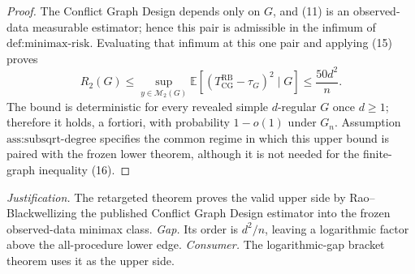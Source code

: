 \documentclass{article}
\begin{document}
\begin{proof}
The Conflict Graph Design depends only on \(G\), and (11) is an observed-data measurable estimator; hence this pair is admissible in the infimum of \(\text{def:minimax-risk}\).  Evaluating that infimum at this one pair and applying (15) proves
\[
R_2(G)\le
\sup_{y\in\mathcal M_2(G)}
\mathbb E[(T_{\mathrm{CG}}^{\mathrm{RB}}-\tau_G)^2\mid G]
\le\frac{50d^2}{n}. \tag{16}
\]
The bound is deterministic for every revealed simple \(d\)-regular \(G\) once \(d\ge1\); therefore it holds, a fortiori, with probability \(1-o(1)\) under \(G_n\).  Assumption \(\text{ass:subsqrt-degree}\) specifies the common regime in which this upper bound is paired with the frozen lower theorem, although it is not needed for the finite-graph inequality (16).
\end{proof}
\par\smallskip\noindent \textit{Justification.} The retargeted theorem proves the valid upper side by Rao--Blackwellizing the published Conflict Graph Design estimator into the frozen observed-data minimax class. \textit{Gap.} Its order is \(d^2/n\), leaving a logarithmic factor above the all-procedure lower edge. \textit{Consumer.} The logarithmic-gap bracket theorem uses it as the upper side.
\end{document}
